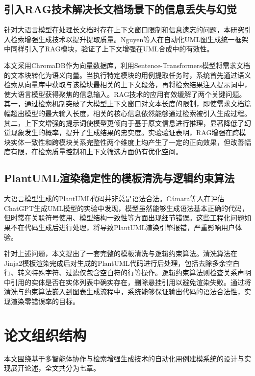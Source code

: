 \subsection{引入RAG技术解决长文档场景下的信息丢失与幻觉}

针对大语言模型在处理长文档时存在上下文窗口限制和信息遗忘的问题，本研究引入检索增强生成技术以提升提取质量。Nguyen等人\cite{nguyen2026novel}在自动化UML图生成统一框架中同样引入了RAG模块，验证了上下文增强在UML合成中的有效性。

本文采用ChromaDB作为向量数据库，利用Sentence-Transformers模型将需求文档的文本块转化为语义向量。当执行特定模块的用例提取任务时，系统首先通过语义检索从向量库中获取与该模块最相关的上下文段落，再将检索结果注入提示词中，使大语言模型获得聚焦的信息输入。RAG技术的应用有效缓解了两个关键问题。其一，通过检索机制突破了大模型上下文窗口对文本长度的限制，即使需求文档篇幅超出模型的最大输入长度，相关的核心信息依然能够通过检索被引入生成过程。其二，上下文增强的提示词使模型更倾向于基于原文信息进行推理，显著降低了幻觉现象发生的概率，提升了生成结果的忠实度。实验验证表明，RAG增强在跨模块实体一致性和跨模块关系完整性两个维度上均产生了一定的正向效果，但改善幅度有限，在检索质量控制和上下文筛选方面仍有优化空间。

\subsection{PlantUML渲染稳定性的模板清洗与逻辑约束算法}

大语言模型生成的PlantUML代码并非总是语法合法。Cámara等人\cite{camara2023assessment}在评估ChatGPT生成UML模型的实验中发现，模型虽然能够生成语法基本正确的代码，但时常在关联符号使用、模型结构一致性等方面出现细节错误。这些工程化问题如果不在代码生成后进行处理，将导致PlantUML渲染引擎报错，严重影响用户体验。

针对上述问题，本文提出了一套完整的模板清洗与逻辑约束算法。清洗算法在Jinja2模板渲染完成后对生成的PlantUML代码进行后处理，包括去除多余空白行、转义特殊字符、过滤仅包含空白符的行等操作。逻辑约束算法则检查关系声明中引用的实体是否在实体列表中确实存在，删除悬挂引用以避免渲染失败。通过将清洗与约束算法嵌入到图表生成流程中，系统能够保证输出代码的语法合法性，实现渲染零错误率的目标。

\section{论文组织结构}

本文围绕基于多智能体协作与检索增强生成技术的自动化用例建模系统的设计与实现展开论述，全文共分为七章。

